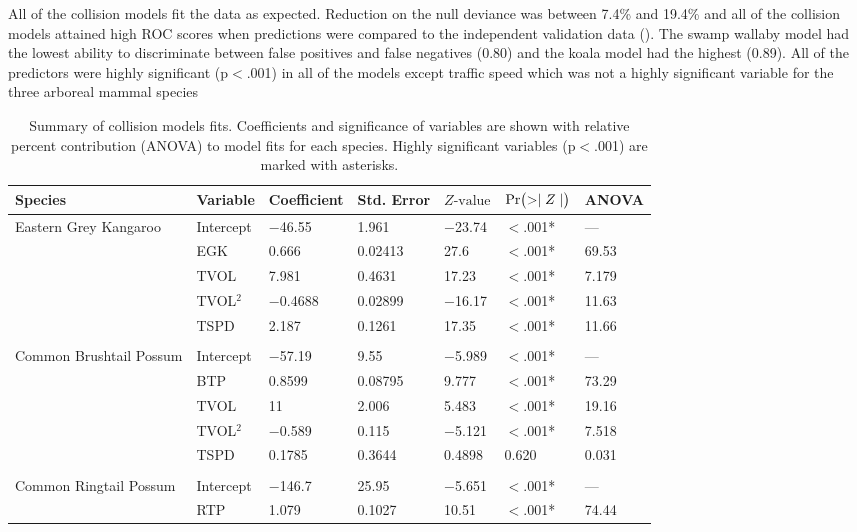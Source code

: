 All of the collision models fit the data as expected.  Reduction on the null deviance was between 7.4\% and 19.4\% and all of the collision models attained high ROC scores when predictions were compared to the independent validation data ().  The swamp wallaby model had the lowest ability to discriminate between false positives and false negatives (0.80) and the koala model had the highest (0.89). All of the predictors were highly significant (p$<$.001) in all of the models except traffic speed which was not a highly significant variable for the three arboreal mammal species

\begin{table}[htp]
\caption[Summary of collision models for six mammal species]{Summary of collision models fits. Coefficients and significance of variables are shown with relative percent contribution (ANOVA) to model fits for each species.  Highly significant variables (p$<$.001) are marked with asterisks.}
\centering
\begin{tabularx}{0.9\textwidth}{lllllll} \toprule
Species & Variable & Coefficient & Std. Error & $Z\text{-value}$ & $\text{Pr}\bigl( >\mid Z \mid \bigr)$ & ANOVA \\ 
\midrule
Eastern Grey Kangaroo & Intercept & $-$46.55 & 1.961 & $-$23.74 & $<$.001* & --- \\ 
   & EGK & 0.666 & 0.02413 & 27.6 & $<$.001* & 69.53 \\ 
   & TVOL & 7.981 & 0.4631 & 17.23 & $<$.001* & 7.179 \\ 
   & TVOL$^2$ & $-$0.4688 & 0.02899 & $-$16.17 & $<$.001* & 11.63 \\ 
   & TSPD & 2.187 & 0.1261 & 17.35 & $<$.001* & 11.66 \\ 
   &  &  &  &  &  &  \\ 
Common Brushtail Possum & Intercept & $-$57.19 & 9.55 & $-$5.989 & $<$.001* & --- \\ 
   & BTP & 0.8599 & 0.08795 & 9.777 & $<$.001* & 73.29 \\ 
   & TVOL & 11 & 2.006 & 5.483 & $<$.001* & 19.16 \\ 
   & TVOL$^2$ & $-$0.589 & 0.115 & $-$5.121 & $<$.001* & 7.518 \\ 
   & TSPD & 0.1785 & 0.3644 & 0.4898 & 0.620 & 0.031 \\ 
   &  &  &  &  &  &  \\ 
Common Ringtail Possum & Intercept & $-$146.7 & 25.95 & $-$5.651 & $<$.001* & --- \\ 
   & RTP & 1.079 & 0.1027 & 10.51 & $<$.001* & 74.44 \\ 

\end{tabularx}
\end{table}
